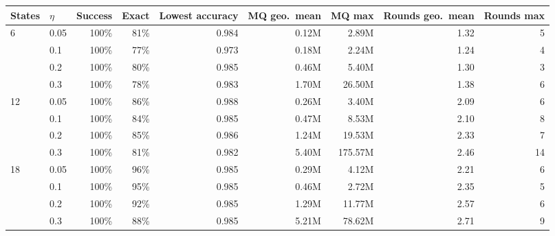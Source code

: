 \begin{tabular}{llrrrrrrr}
\toprule
States & $\eta$ & Success & Exact & Lowest accuracy & MQ geo.\ mean & MQ max & Rounds geo.\ mean & Rounds max \\
\midrule
\multirow{4}{*}{6} & 0.05 & 100\% & 81\% & 0.984 & 0.12M & 2.89M & 1.32 & 5 \\
 & 0.1 & 100\% & 77\% & 0.973 & 0.18M & 2.24M & 1.24 & 4 \\
 & 0.2 & 100\% & 80\% & 0.985 & 0.46M & 5.40M & 1.30 & 3 \\
 & 0.3 & 100\% & 78\% & 0.983 & 1.70M & 26.50M & 1.38 & 6 \\
\midrule
\multirow{4}{*}{12} & 0.05 & 100\% & 86\% & 0.988 & 0.26M & 3.40M & 2.09 & 6 \\
 & 0.1 & 100\% & 84\% & 0.985 & 0.47M & 8.53M & 2.10 & 8 \\
 & 0.2 & 100\% & 85\% & 0.986 & 1.24M & 19.53M & 2.33 & 7 \\
 & 0.3 & 100\% & 81\% & 0.982 & 5.40M & 175.57M & 2.46 & 14 \\
\midrule
\multirow{4}{*}{18} & 0.05 & 100\% & 96\% & 0.985 & 0.29M & 4.12M & 2.21 & 6 \\
 & 0.1 & 100\% & 95\% & 0.985 & 0.46M & 2.72M & 2.35 & 5 \\
 & 0.2 & 100\% & 92\% & 0.985 & 1.29M & 11.77M & 2.57 & 6 \\
 & 0.3 & 100\% & 88\% & 0.985 & 5.21M & 78.62M & 2.71 & 9 \\
\bottomrule
\end{tabular}
